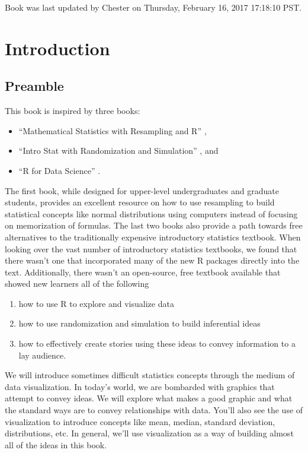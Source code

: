 \documentclass[]{tufte-book}
\providecommand{\tightlist}{%
  \setlength{\itemsep}{0pt}\setlength{\parskip}{0pt}}
\begin{document}
Book was last updated by Chester on Thursday, February 16, 2017 17:18:10
PST.

\chapter{Introduction}\label{intro}

\section{Preamble}\label{preamble-1}

This book is inspired by three books:

\begin{itemize}
\tightlist
\item
  ``Mathematical Statistics with Resampling and R'' \citep{hester2011},
\item
  ``Intro Stat with Randomization and Simulation'' \citep{isrs2014}, and
\item
  ``R for Data Science'' \citep{rds2016}.
\end{itemize}

The first book, while designed for upper-level undergraduates and
graduate students, provides an excellent resource on how to use
resampling to build statistical concepts like normal distributions using
computers instead of focusing on memorization of formulas. The last two
books also provide a path towards free alternatives to the traditionally
expensive introductory statistics textbook. When looking over the vast
number of introductory statistics textbooks, we found that there wasn't
one that incorporated many of the new R packages directly into the text.
Additionally, there wasn't an open-source, free textbook available that
showed new learners all of the following

\begin{enumerate}
\def\labelenumi{\arabic{enumi}.}
\tightlist
\item
  how to use R to explore and visualize data
\item
  how to use randomization and simulation to build inferential ideas
\item
  how to effectively create stories using these ideas to convey
  information to a lay audience.
\end{enumerate}

We will introduce sometimes difficult statistics concepts through the
medium of data visualization. In today's world, we are bombarded with
graphics that attempt to convey ideas. We will explore what makes a good
graphic and what the standard ways are to convey relationships with
data. You'll also see the use of visualization to introduce concepts
like mean, median, standard deviation, distributions, etc. In general,
we'll use visualization as a way of building almost all of the ideas in
this book.
\end{document}
